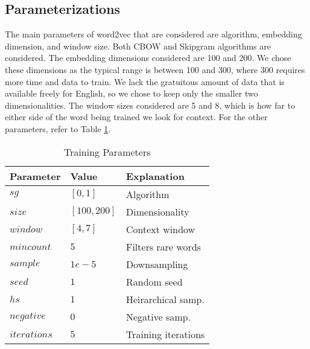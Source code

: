 \subsection{Parameterizations}

The main parameters of word2vec that are considered are algorithm, embedding dimension, and window size. Both CBOW and Skipgram algorithms are considered. The embedding dimensions considered are 100 and 200. We chose these dimensions as the typical range is between 100 and 300, where 300 requires more time and data to train. We lack the gratuitous amount of data that is available freely for English, so we chose to keep only the smaller two dimensionalities. The window sizes considered are 5 and 8, which is how far to either side of the word being trained we look for context. For the other parameters, refer to Table \ref{table:params}.

\begin{table}
\begin{tabular}{l|l|l}
\textbf{Parameter} & \textbf{Value} & \textbf{Explanation} \\
\hline
$sg$ & $[0,1]$ & Algorithm \\
$size$ & $[100, 200]$ & Dimensionality \\
$window$ & $[4, 7]$ & Context window \\
$min count$ & $5$ & Filters rare words \\
$sample$ & $1e-5$ & Downsampling \\
$seed$ & $1$ & Random seed \\
$hs$ & $1$ & Heirarchical samp. \\
$negative$ & $0$ & Negative samp. \\
$iterations$ & $5$ & Training iterations \\
\end{tabular}
\caption{Training Parameters}
\label{table:params}
\end{table}